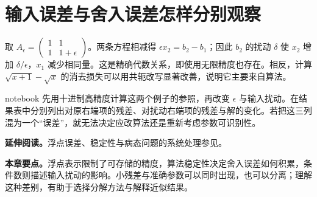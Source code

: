 \section{输入误差与舍入误差怎样分别观察}
取 $A_\epsilon=\left(\begin{smallmatrix}1&1\\1&1+\epsilon\end{smallmatrix}\right)$。两条方程相减得 $\epsilon x_2=b_2-b_1$；因此 $b_2$ 的扰动 $\delta$ 使 $x_2$ 增加 $\delta/\epsilon$，$x_1$ 减少相同量。这是精确代数关系，即使用无限精度也存在。相反，计算 $\sqrt{x+1}-\sqrt x$ 的消去损失可以用共轭改写显著改善，说明它主要来自算法。

notebook 先用十进制高精度计算这两个例子的参照，再改变 $\epsilon$ 与输入扰动。在结果表中分别列出对原右端项的残差、对扰动右端项的残差与解的变化。若把这三列混为一个“误差”，就无法决定应改算法还是重新考虑参数可识别性。

\noindent\textbf{延伸阅读。}浮点误差、稳定性与病态问题的系统处理参见\cite{higham2002accuracy,golub2013matrix}。




\enlargethispage{3\baselineskip}
\noindent\textbf{本章要点。}浮点表示限制了可存储的精度，算法稳定性决定舍入误差如何积累，条件数则描述输入扰动的影响。小残差与准确参数可以同时出现，也可以分离；理解这种差别，有助于选择分解方法与解释近似结果。
